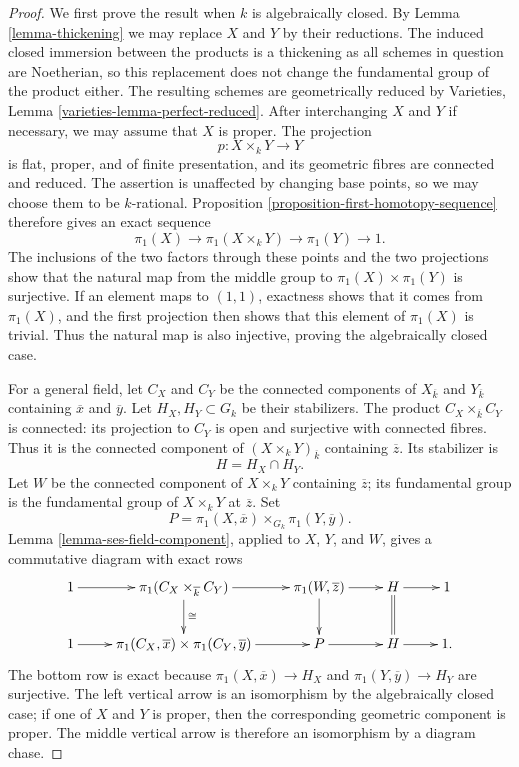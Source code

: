 \begin{proof}
We first prove the result when $k$ is algebraically closed. By
Lemma \ref{lemma-thickening} we may replace $X$ and $Y$ by their reductions.
The induced closed immersion between the products is a thickening as all
schemes in question are Noetherian, so this replacement does not change the
fundamental group of the product either. The resulting schemes are
geometrically reduced by Varieties, Lemma
\ref{varieties-lemma-perfect-reduced}. After interchanging
$X$ and $Y$ if necessary, we may assume that $X$ is proper. The projection
$$
p : X \times_k Y \longrightarrow Y
$$
is flat, proper, and of finite presentation, and its geometric fibres are
connected and reduced. The assertion is unaffected by changing base points,
so we may choose them to be $k$-rational. Proposition
\ref{proposition-first-homotopy-sequence} therefore gives an exact sequence
$$
\pi_1(X) \longrightarrow \pi_1(X \times_k Y)
\longrightarrow \pi_1(Y) \longrightarrow 1.
$$
The inclusions of the two factors through these points and the two
projections show that the natural
map from the middle group to $\pi_1(X) \times \pi_1(Y)$ is surjective. If an
element maps to $(1, 1)$, exactness shows that it comes from $\pi_1(X)$, and
the first projection then shows that this element of $\pi_1(X)$ is trivial.
Thus the natural map is also injective, proving the algebraically closed
case.

\medskip\noindent
For a general field, let $C_X$ and $C_Y$ be the connected components of
$X_{\overline{k}}$ and $Y_{\overline{k}}$ containing $\overline{x}$ and
$\overline{y}$. Let $H_X, H_Y \subset G_k$ be their stabilizers. The product
$C_X \times_{\overline{k}} C_Y$ is connected: its projection to $C_Y$ is
open and surjective with connected fibres. Thus it is the connected component
of $(X \times_k Y)_{\overline{k}}$ containing $\overline{z}$. Its stabilizer is
$$
H = H_X \cap H_Y.
$$
Let $W$ be the connected component of $X \times_k Y$ containing
$\overline{z}$; its fundamental group is the fundamental group of
$X \times_k Y$ at $\overline{z}$. Set
$$
P = \pi_1(X, \overline{x}) \times_{G_k}
\pi_1(Y, \overline{y}).
$$
Lemma \ref{lemma-ses-field-component}, applied to $X$, $Y$, and $W$, gives
a commutative diagram with exact rows
$$
\xymatrix{
1 \ar[r] & \pi_1(C_X \times_{\overline{k}} C_Y) \ar[r]
\ar[d]^{\cong} &
\pi_1(W, \overline{z}) \ar[r] \ar[d] &
H \ar[r] \ar@{=}[d] & 1 \\
1 \ar[r] & \pi_1(C_X, \overline{x}) \times
\pi_1(C_Y, \overline{y}) \ar[r] &
P \ar[r] & H \ar[r] & 1.
}
$$
The bottom row is exact because
$\pi_1(X, \overline{x}) \to H_X$ and
$\pi_1(Y, \overline{y}) \to H_Y$ are surjective. The left vertical arrow
is an isomorphism by the algebraically closed case; if one of $X$ and $Y$
is proper, then the corresponding geometric component is proper. The middle
vertical arrow is therefore an isomorphism by a diagram chase.
\end{proof}




